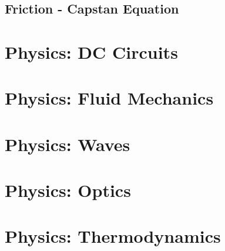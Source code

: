 \documentclass{article}
\begin{document}
\subsection{Friction - Capstan Equation}
\section{Physics: DC Circuits}
\section{Physics: Fluid Mechanics}
\section{Physics: Waves}
\section{Physics: Optics}
\section{Physics: Thermodynamics}
\end{document}
